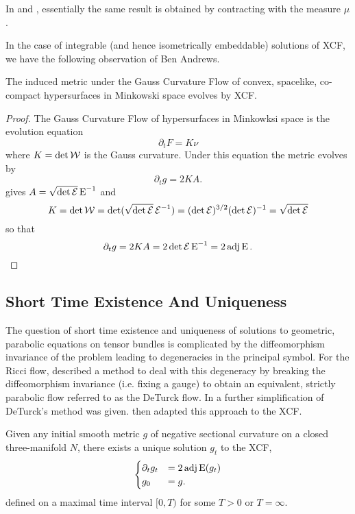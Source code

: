 \documentclass[a4paper,12pt]{amsart}
\begin{document}
\begin{rem}
In \cite[Lemma 3]{MR2055396} and \cite[Equation (3)]{MR2207496}, essentially the same result is obtained by contracting with the measure \(\mu\).
\end{rem}

In the case of integrable (and hence isometrically embeddable) solutions of XCF, we have the following observation of Ben Andrews.

\begin{lemma}[{\cite[Section 11]{MR3344442}}]
\label{lem:xcf_gcf}
The induced metric under the Gauss Curvature Flow of convex, spacelike, co-compact hypersurfaces in Minkowski space evolves by XCF.
\end{lemma}

\begin{proof}
The Gauss Curvature Flow of hypersurfaces in Minkowksi space is the evolution equation
\[
\partial_t F = K\nu
\]
where \(K = \det \operatorname{\mathcal{W}}\) is the Gauss curvature. Under this equation the metric evolves by
\[
\partial_t g = 2KA.
\]
 gives \(A = \sqrt{\det \operatorname{\mathcal{E}}} \operatorname{E}^{-1}\) and
\[
K = \det \operatorname{\mathcal{W}} = \det (\sqrt{\det \operatorname{\mathcal{E}}} \operatorname{\mathcal{E}}^{-1}) = (\det \operatorname{\mathcal{E}})^{3/2} (\det \operatorname{\mathcal{E}})^{-1} = \sqrt{\det \operatorname{\mathcal{E}}}
\]
so that
\[
\partial_t g = 2KA = 2 \det \operatorname{\mathcal{E}} \operatorname{E}^{-1} = 2 \operatorname{adj} \operatorname{E}.
\]
\end{proof}

\subsection{Short Time Existence And Uniqueness}
\label{subsec:xcf_existence_uniqueness}

The question of short time existence and uniqueness of solutions to geometric, parabolic equations on tensor bundles is complicated by the diffeomorphism invariance of the problem leading to degeneracies in the principal symbol. For the Ricci flow, \cite{MR697987} described a method to deal with this degeneracy by breaking the diffeomorphism invariance (i.e. fixing a gauge) to obtain an equivalent, strictly parabolic flow referred to as the DeTurck flow. In \cite[Section 6]{MR1375255} a further simplification of DeTurck's method was given. \cite{MR2207496} then adapted this approach to the XCF.

\begin{thm}
\label{thm:xcf_existence_uniqueness}
Given any initial smooth metric \(g\) of negative sectional curvature on a closed three-manifold \(N\), there exists a unique solution \(g_t\) to the XCF,
\[
\begin{cases}
\partial_t g_t &= 2\operatorname{adj}\operatorname{E}(g_t) \\
g_0 &= g.
\end{cases}
\]
defined on a maximal time interval \([0, T)\) for some \(T > 0\) or \(T = \infty\).
\end{thm}
\end{document}
